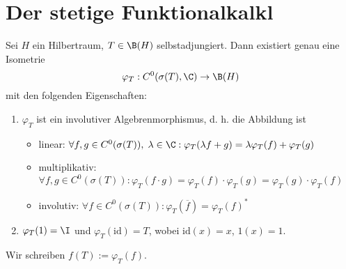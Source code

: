\section{Der stetige Funktionalkalk\us l}
\begin{theorem}
	Sei $H$ ein Hilbertraum, \(T\in \B(H)\) selbstadjungiert. Dann existiert genau eine Isometrie 
	\[\varphi_T: C^0(\sigma(T),\C) \to \B(H)\]
	mit den folgenden Eigenschaften:
	\begin{enumerate}
		\item $\varphi_T$ ist ein involutiver Algebrenmorphismus, d. h. die Abbildung ist
		\begin{itemize}
		\item linear:\;\; \(\forall f, g \in C^0(\sigma(T)), \;\lambda \in \C: \varphi_T( \lambda f+g)  = \lambda \varphi_T(f) + \varphi_T(g)\)
		\item multiplikativ: \;\;\(\forall f, g \in C^0(\sigma(T)): \varphi_T(f\cdot g) = \varphi_T(f)\cdot\varphi_T(g) = \varphi_T(g) \cdot \varphi_T(f)\)
		\item involutiv: \;\; \(\forall f \in C^0(\sigma(T)): \varphi_T(\overline{f}) = \varphi_T(f)^*\)
		\end{itemize}
		\item \(\varphi_T(1) = \I\) und \(\varphi_T(\text{id}) = T\), wobei \(\text{id}(x) = x\), \(1(x) = 1\).
	\end{enumerate}
\end{theorem}

\begin{rem}
	Wir schreiben \(f(T) := \varphi_T(f)\).
\end{rem}

